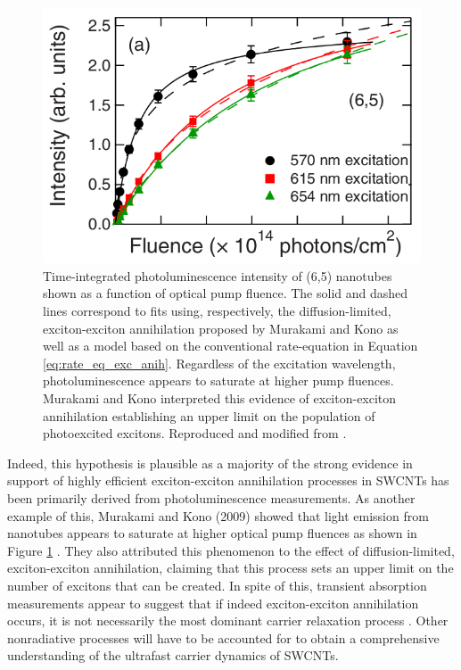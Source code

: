 \begin{figure}[ht]
	\centering
	\includegraphics[scale=1.7]{images/chapter_prior_works/murakami_pl_saturation}
	\caption{Time-integrated photoluminescence intensity of (6,5) nanotubes shown as a function of optical pump fluence. The solid and dashed lines correspond to fits using, respectively, the diffusion-limited, exciton-exciton annihilation proposed by Murakami and Kono as well as a model based on the conventional rate-equation in Equation \eqref{eq:rate_eq_exc_anih}. Regardless of the excitation wavelength, photoluminescence appears to saturate at higher pump fluences. Murakami and Kono interpreted this evidence of exciton-exciton annihilation establishing an upper limit on the population of photoexcited excitons. Reproduced and modified from \cite{murakami2009existence}. }
	\label{fig:pl_saturation_murakami}
\end{figure}

 Indeed, this hypothesis is plausible as a majority of the strong evidence in support of highly efficient exciton-exciton annihilation processes in SWCNTs has been primarily derived from photoluminescence measurements. As another example of this, Murakami and Kono (2009) showed that light emission from nanotubes appears to saturate at higher optical pump fluences as shown in Figure \ref{fig:pl_saturation_murakami} \cite{murakami2009existence}. They also attributed this phenomenon to the effect of diffusion-limited, exciton-exciton annihilation, claiming that this process sets an upper limit on the number of excitons that can be created. In spite of this, transient absorption measurements appear to suggest that if indeed exciton-exciton annihilation occurs, it is not necessarily the most dominant carrier relaxation process \cite{ostojic2004interband, manzoni2005intersubband, luer2009size}. Other nonradiative processes will have to be accounted for to obtain a comprehensive understanding of the ultrafast carrier dynamics of SWCNTs.




